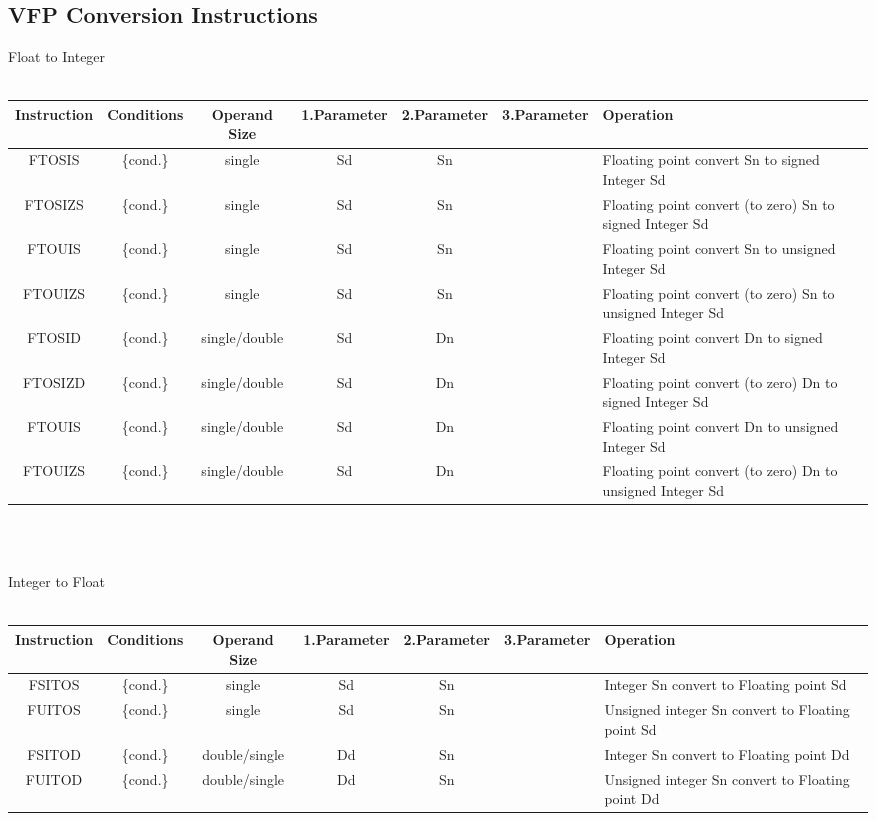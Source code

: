 \begin{landscape}
\section{VFP Conversion Instructions}
{\rot Float to Integer}\\
\\
\begin{tabular}{|c|c|c|c|c|c|l|}
\hline
Instruction & Conditions & Operand Size & 1.Parameter & 2.Parameter & 3.Parameter & Operation\\
\hline
FTOSIS & \{cond.\} & single & Sd & Sn &  & Floating point convert Sn to signed Integer Sd\\
\hline
FTOSIZS & \{cond.\} & single & Sd & Sn &  & Floating point convert (to zero) Sn to signed Integer Sd\\
\hline
FTOUIS & \{cond.\} & single & Sd & Sn &  & Floating point convert Sn to unsigned Integer Sd\\
\hline
FTOUIZS & \{cond.\} & single & Sd & Sn &  & Floating point convert (to zero) Sn to unsigned Integer Sd\\
\hline
\hline
FTOSID & \{cond.\} & single/double & Sd & Dn &  & Floating point convert Dn to signed Integer Sd\\
\hline
FTOSIZD & \{cond.\} & single/double & Sd & Dn &  & Floating point convert (to zero) Dn to signed Integer Sd\\
\hline
FTOUIS & \{cond.\} & single/double & Sd & Dn &  & Floating point convert Dn to unsigned Integer Sd\\
\hline
FTOUIZS & \{cond.\} & single/double & Sd & Dn &  & Floating point convert (to zero) Dn to unsigned Integer Sd\\ 
\hline
\end{tabular}\\
\\
\newpage

{\rot Integer to Float}\\
\\
\begin{tabular}{|c|c|c|c|c|c|l|}
\hline
Instruction & Conditions & Operand Size & 1.Parameter & 2.Parameter & 3.Parameter & Operation\\
\hline
FSITOS & \{cond.\} & single & Sd & Sn &  & Integer Sn convert to Floating point Sd\\
\hline
FUITOS & \{cond.\} & single & Sd & Sn &  & Unsigned integer Sn convert to Floating point Sd\\
\hline
FSITOD & \{cond.\} & double/single & Dd & Sn &  & Integer Sn convert to Floating point Dd\\
\hline
FUITOD & \{cond.\} & double/single & Dd & Sn &  & Unsigned integer Sn convert to Floating point Dd\\
\hline
\end{tabular}\\
\\


\end{landscape}
